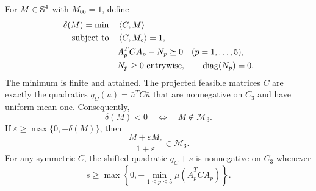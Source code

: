\begin{proposition}\label{comp:hull-depth}
For $M\in\mathbb S^{4}$ with $M_{00}=1$, define
\begin{equation}\label{comp:depth}
 \begin{split}
 \delta(M)=\min\quad&\left\langle C,M\right\rangle\\
 \text{subject to}\quad&\left\langle C,M_c\right\rangle=1,\\
 &\bar A_p^TC\bar A_p-N_p\succeq0\quad(p=1,\ldots,5),\\
 &N_p\geq0\ \text{entrywise},\qquad\operatorname{diag}(N_p)=0.
 \end{split}
\end{equation}
The minimum is finite and attained. The projected feasible matrices $C$
are exactly the quadratics $q_C(u)=\bar u^TC\bar u$ that are
nonnegative on $C_3$ and have uniform mean one. Consequently,
\[
 \delta(M)<0\quad\Longleftrightarrow\quad
 M\notin\mathcal M_3.
\]
If $\varepsilon\geq\max\{0,-\delta(M)\}$, then
\begin{equation}\label{comp:depth-mixing}
 \frac{M+\varepsilon M_c}{1+\varepsilon}
       \in\mathcal M_3.
\end{equation}
For any symmetric $C$, the shifted quadratic $q_C+s$ is nonnegative
on $C_3$ whenever
\begin{equation}\label{comp:shift}
 s\geq\max\left\{0,-\min_{1\leq p\leq5}
          \mu(\bar A_p^TC\bar A_p)\right\}.
\end{equation}
\end{proposition}

